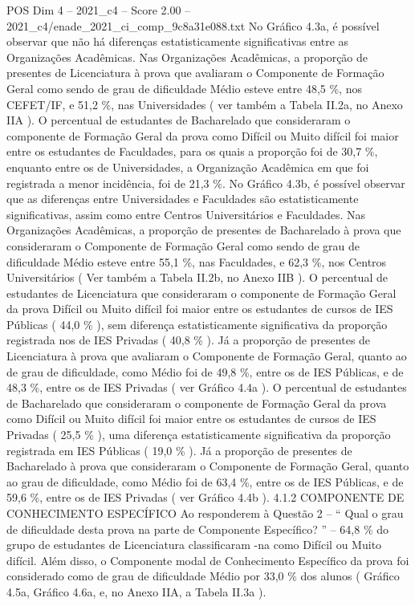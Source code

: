 \begin{textsample}{POS Dim 4 – 2021\_c4 – Score 2.00 – 2021\_c4/enade\_2021\_ci\_comp\_9c8a31e088.txt}
No Gráfico 4.3a, é possível observar que não há diferenças estatisticamente significativas entre as Organizações Acadêmicas.
Nas Organizações Acadêmicas, a proporção de presentes de Licenciatura à prova que avaliaram o Componente de Formação Geral como sendo de grau de dificuldade Médio esteve entre 48,5 \%, nos CEFET/IF, e 51,2 \%, nas Universidades ( ver também a Tabela II.2a, no Anexo IIA ).
O percentual de estudantes de Bacharelado que consideraram o componente de Formação Geral da prova como Difícil ou Muito difícil foi maior entre os estudantes de Faculdades, para os quais a proporção foi de 30,7 \%, enquanto entre os de Universidades, a Organização Acadêmica em que foi registrada a menor incidência, foi de 21,3 \%.
No Gráfico 4.3b, é possível observar que as diferenças entre Universidades e Faculdades são estatisticamente significativas, assim como entre Centros Universitários e Faculdades.
Nas Organizações Acadêmicas, a proporção de presentes de Bacharelado à prova que consideraram o Componente de Formação Geral como sendo de grau de dificuldade Médio esteve entre 55,1 \%, nas Faculdades, e 62,3 \%, nos Centros Universitários ( Ver também a Tabela II.2b, no Anexo IIB ).
O percentual de estudantes de Licenciatura que consideraram o componente de Formação Geral da prova Difícil ou Muito difícil foi maior entre os estudantes de cursos de IES Públicas ( 44,0 \% ), sem diferença estatisticamente significativa da proporção registrada nos de IES Privadas ( 40,8 \% ).
Já a proporção de presentes de Licenciatura à prova que avaliaram o Componente de Formação Geral, quanto ao de grau de dificuldade, como Médio foi de 49,8 \%, entre os de IES Públicas, e de 48,3 \%, entre os de IES Privadas ( ver Gráfico 4.4a ).
O percentual de estudantes de Bacharelado que consideraram o componente de Formação Geral da prova como Difícil ou Muito difícil foi maior entre os estudantes de cursos de IES Privadas ( 25,5 \% ), uma diferença estatisticamente significativa da proporção registrada em IES Públicas ( 19,0 \% ).
Já a proporção de presentes de Bacharelado à prova que consideraram o Componente de Formação Geral, quanto ao grau de dificuldade, como Médio foi de 63,4 \%, entre os de IES Públicas, e de 59,6 \%, entre os de IES Privadas ( ver Gráfico 4.4b ). 4.1.2 COMPONENTE DE CONHECIMENTO ESPECÍFICO Ao responderem à Questão 2 – “ Qual o grau de dificuldade desta prova na parte de Componente Específico? ” – 64,8 \% do grupo de estudantes de Licenciatura classificaram -na como Difícil ou Muito difícil.
Além disso, o Componente modal de Conhecimento Específico da prova foi considerado como de grau de dificuldade Médio por 33,0 \% dos alunos ( Gráfico 4.5a, Gráfico 4.6a, e, no Anexo IIA, a Tabela II.3a ).

\end{textsample}
